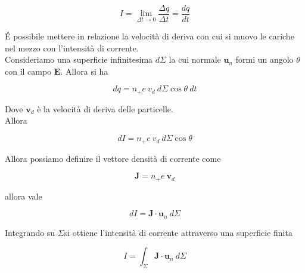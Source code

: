 \begin{tcolorbox}[colback=yellow!10!white, colframe=orange!70!black, boxrule=0.8pt]
\begin{equation}
    I = \lim_{\Delta t \to 0 } \frac{\Delta q}{\Delta t} = \frac{dq}{dt}
\end{equation}
\end{tcolorbox}

\' E possibile mettere in relazione la velocità di deriva con cui si muovo le cariche nel mezzo con l'intensità di corrente. \\

Consideriamo una superficie infinitesima $d \Sigma$ la cui normale $\mathbf{u}_n$ formi un angolo $\theta$ con il campo $\mathbf{E}$. Allora si ha 

\begin{equation*}
    dq = n_+ e \ v_d \ d \Sigma \cos \theta \ d t
\end{equation*}

Dove $\mathbf{v}_d$ è la velocità di deriva delle particelle.\\ 

Allora 

\begin{equation*}
    dI = n_+ e \ v_d \ d\Sigma \cos \theta
\end{equation*}

Allora possiamo definire il vettore densità di corrente come

\begin{tcolorbox}[colback=yellow!10!white, colframe=orange!70!black, boxrule=0.8pt]
\begin{equation}
    \mathbf{J} = n_+ e \ \mathbf{v}_d 
    \label{eq:densità_corrente}
\end{equation}
\end{tcolorbox}

allora vale

\begin{equation}
    dI = \mathbf{J} \cdot \mathbf{u}_n \ d \Sigma
\end{equation}

Integrando su $ \Sigma $si ottiene l'intensità di corrente attraverso una superficie finita 

\begin{tcolorbox}[colback=yellow!10!white, colframe=orange!70!black, boxrule=0.8pt]
\begin{equation}
    I = \int_{\Sigma} \mathbf{J} \cdot \mathbf{u}_n \ d\Sigma
\end{equation}
\end{tcolorbox}

